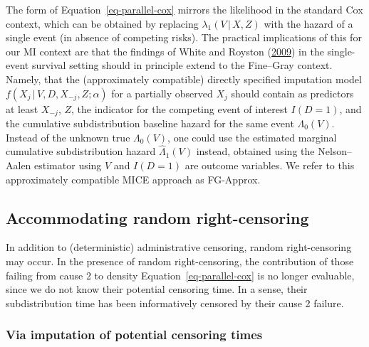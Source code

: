 \documentclass[
  letterpaper,
  DIV=11,
  numbers=noendperiod]{scrreprt}
\newcommand{\given}{\,|\,}
\begin{document}
The form of Equation~\ref{eq-parallel-cox} mirrors the likelihood in the
standard Cox context, which can be obtained by replacing
\(\lambda_1(V \given X, Z)\) with the hazard of a single event (in
absence of competing risks). The practical implications of this for our
MI context are that the findings of White and Royston
(\protect\hyperlink{ref-whiteImputingMissingCovariate2009}{2009}) in the
single-event survival setting should in principle extend to the
Fine--Gray context. Namely, that the (approximately compatible) directly
specified imputation model \(f(X_j \given V, D, X_{-j}, Z;\alpha)\) for
a partially observed \(X_j\) should contain as predictors at least
\(X_{-j}\), \(Z\), the indicator for the competing event of interest
\(I(D = 1)\), and the cumulative subdistribution baseline hazard for the
same event \(\Lambda_0(V)\). Instead of the unknown true
\(\Lambda_0(V)\), one could use the estimated marginal cumulative
subdistribution hazard \(\hat{\Lambda}_1(V)\) instead, obtained using
the Nelson--Aalen estimator using \(V\) and \(I(D = 1)\) are outcome
variables. We refer to this approximately compatible MICE approach as
FG-Approx.

\hypertarget{accommodating-random-right-censoring}{%
\subsection{Accommodating random
right-censoring}\label{accommodating-random-right-censoring}}

In addition to (deterministic) administrative censoring, random
right-censoring may occur. In the presence of random right-censoring,
the contribution of those failing from cause 2 to density
Equation~\ref{eq-parallel-cox} is no longer evaluable, since we do not
know their potential censoring time. In a sense, their subdistribution
time has been informatively censored by their cause 2 failure.

\hypertarget{sec-imp-cens}{%
\subsubsection{Via imputation of potential censoring
times}\label{sec-imp-cens}}
\end{document}
